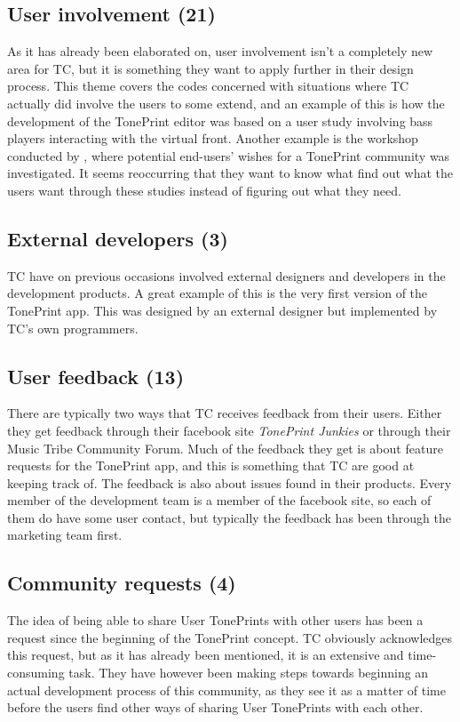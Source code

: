 \subsection*{User involvement (21)} 
\label{App:ThemeUserInvolvement}
As it has already been elaborated on, user involvement isn't a completely new area for TC, but it is something they want to apply further in their design process. This theme covers the codes concerned with situations where TC actually did involve the users to some extend, and an example of this is how the development of the TonePrint editor was based on a user study involving bass players interacting with the virtual front. Another example is the workshop conducted by \textcite{PDF:BrugerWorkshopUserTonePrints}, where potential end-users' wishes for a TonePrint community was investigated. It seems reoccurring that they want to know what find out what the users want through these studies instead of figuring out what they need.

\subsection*{External developers (3)} 
\label{App:ThemeExternalDevelopers}
TC have on previous occasions involved external designers and developers in the development products. A great example of this is the very first version of the TonePrint app. This was designed by an external designer but implemented by TC's own programmers.

\subsection*{User feedback (13)} 
\label{App:ThemeUserFeedback}
There are typically two ways that TC receives feedback from their users. Either they get feedback through their facebook site \textit{TonePrint Junkies} or through their Music Tribe Community Forum. Much of the feedback they get is about feature requests for the TonePrint app, and this is something that TC are good at keeping track of. The feedback is also about issues found in their products. Every member of the development team is a member of the facebook site, so each of them do have some user contact, but typically the feedback has been through the marketing team first.

\subsection*{Community requests (4)} 
\label{App:ThemeCommunityRequests}
The idea of being able to share User TonePrints with other users has been a request since the beginning of the TonePrint concept. TC obviously acknowledges this request, but as it has already been mentioned, it is an extensive and time-consuming task. They have however been making steps towards beginning an actual development process of this community, as they see it as a matter of time before the users find other ways of sharing User TonePrints with each other.

